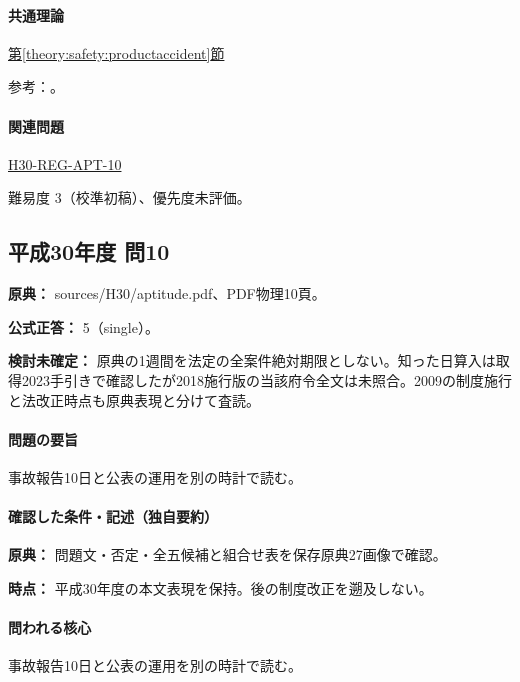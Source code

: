 \paragraph{共通理論} \hyperref[theory:safety:productaccident]{第\ref*{theory:safety:productaccident}節}

\par 参考：\cite{saf53_products2012,saf53_oldnine}。

\paragraph{関連問題} \hyperref[q:h30-reg-apt-10]{H30-REG-APT-10}

\par 難易度 3（校準初稿）、優先度未評価。

\subsection{平成30年度 問10}
\label{q:h30-reg-apt-10}

\noindent\textbf{原典：} sources/H30/aptitude.pdf、PDF物理10頁。

\textbf{公式正答：} 5（single）。

\par\textbf{検討未確定：} 原典の1週間を法定の全案件絶対期限としない。知った日算入は取得2023手引きで確認したが2018施行版の当該府令全文は未照合。2009の制度施行と法改正時点も原典表現と分けて査読。

\paragraph{問題の要旨} 事故報告10日と公表の運用を別の時計で読む。

\paragraph{確認した条件・記述（独自要約）}\mbox{}\par

\noindent\textbf{原典：} 問題文・否定・全五候補と組合せ表を保存原典27画像で確認。\par

\noindent\textbf{時点：} 平成30年度の本文表現を保持。後の制度改正を遡及しない。\par

\paragraph{問われる核心} 事故報告10日と公表の運用を別の時計で読む。

